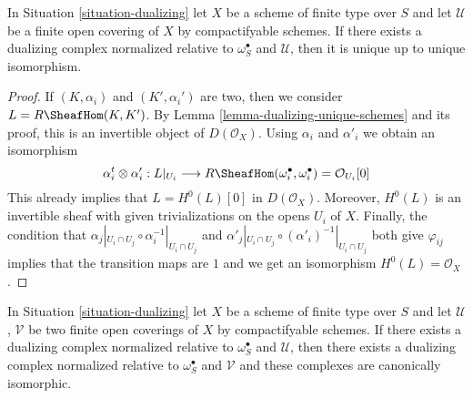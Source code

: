 \begin{lemma}
\label{lemma-good-dualizing-unique}
In Situation \ref{situation-dualizing} let $X$ be a scheme of finite type
over $S$ and let $\mathcal{U}$ be a finite open covering of $X$
by compactifyable schemes. If there exists a dualizing complex
normalized relative to $\omega_S^\bullet$ and $\mathcal{U}$, then it is unique
up to unique isomorphism.
\end{lemma}

\begin{proof}
If $(K, \alpha_i)$ and $(K', \alpha_i')$ are two, then we consider
$L = R\SheafHom(K, K')$. By Lemma \ref{lemma-dualizing-unique-schemes}
and its proof, this is an invertible object of $D(\mathcal{O}_X)$.
Using $\alpha_i$ and $\alpha'_i$ we obtain an isomorphism
$$
\alpha_i^t \otimes \alpha'_i :
L|_{U_i} \longrightarrow
R\SheafHom(\omega_i^\bullet, \omega_i^\bullet) = \mathcal{O}_{U_i}[0]
$$
This already implies that $L = H^0(L)[0]$ in $D(\mathcal{O}_X)$.
Moreover, $H^0(L)$ is an invertible sheaf with given trivializations
on the opens $U_i$ of $X$. Finally, the condition that
$\alpha_j|_{U_i \cap U_j} \circ \alpha_i^{-1}|_{U_i \cap U_j}$
and
$\alpha'_j|_{U_i \cap U_j} \circ (\alpha'_i)^{-1}|_{U_i \cap U_j}$
both give $\varphi_{ij}$ implies that the transition maps
are $1$ and we get an isomorphism $H^0(L) = \mathcal{O}_X$.
\end{proof}

\begin{lemma}
\label{lemma-good-dualizing-independence-covering}
In Situation \ref{situation-dualizing} let $X$ be a scheme of finite type
over $S$ and let $\mathcal{U}$, $\mathcal{V}$ be two finite open coverings
of $X$ by compactifyable schemes.
If there exists a dualizing complex normalized
relative to $\omega_S^\bullet$ and $\mathcal{U}$, then
there exists a dualizing complex normalized relative to
$\omega_S^\bullet$ and $\mathcal{V}$ and these complexes are
canonically isomorphic.
\end{lemma}

